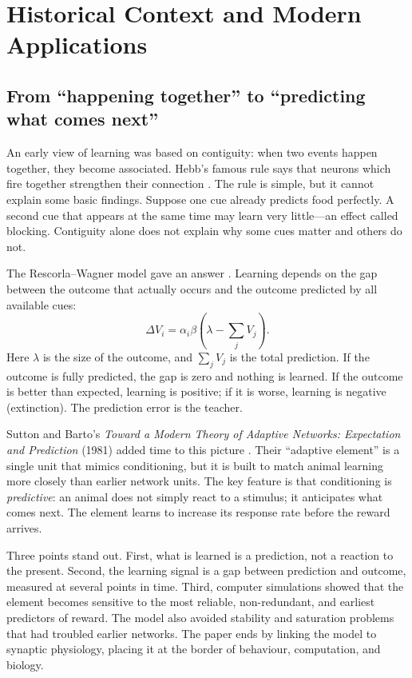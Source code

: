 \documentclass{article}
\begin{document}
\section{Historical Context and Modern Applications}\label{sec:history}

\subsection{From ``happening together'' to ``predicting what comes next''}

An early view of learning was based on contiguity: when two events happen together, they
become associated. Hebb's famous rule says that neurons which fire together strengthen
their connection \citep{hebb1949organization}. The rule is simple, but it cannot explain
some basic findings. Suppose one cue already predicts food perfectly. A second cue that
appears at the same time may learn very little---an effect called blocking. Contiguity
alone does not explain why some cues matter and others do not.

The Rescorla--Wagner model gave an answer \citep{rescorla1972theory}. Learning depends on
the gap between the outcome that actually occurs and the outcome predicted by all
available cues:
\begin{equation}\label{eq:rw}
  \Delta V_i = \alpha_i \beta \left(\lambda - \sum_j V_j\right).
\end{equation}
Here $\lambda$ is the size of the outcome, and $\sum_j V_j$ is the total prediction. If the
outcome is fully predicted, the gap is zero and nothing is learned. If the outcome is
better than expected, learning is positive; if it is worse, learning is negative
(extinction). The prediction error is the teacher.

Sutton and Barto's \emph{Toward a Modern Theory of Adaptive Networks: Expectation and
Prediction} (1981) added time to this picture \citep{sutton1981toward}. Their ``adaptive
element'' is a single unit that mimics conditioning, but it is built to match animal
learning more closely than earlier network units. The key feature is that conditioning is
\emph{predictive}: an animal does not simply react to a stimulus; it anticipates what comes
next. The element learns to increase its response rate before the reward arrives.

Three points stand out. First, what is learned is a prediction, not a reaction to the
present. Second, the learning signal is a gap between prediction and outcome, measured at
several points in time. Third, computer simulations showed that the element becomes
sensitive to the most reliable, non-redundant, and earliest predictors of reward. The model
also avoided stability and saturation problems that had troubled earlier networks. The
paper ends by linking the model to synaptic physiology, placing it at the border of
behaviour, computation, and biology.
\end{document}
